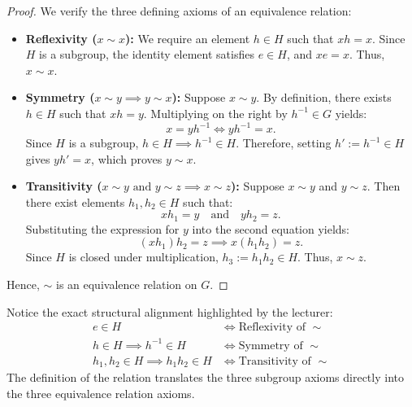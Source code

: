 \begin{content}

\begin{proof}
We verify the three defining axioms of an equivalence relation:
\begin{itemize}
    \item \textbf{Reflexivity ($x \sim x$):}
    We require an element $h \in H$ such that $xh = x$. Since $H$ is a subgroup, the identity element satisfies $e \in H$, and $xe = x$. Thus, $x \sim x$.

    \item \textbf{Symmetry ($x \sim y \implies y \sim x$):}
    Suppose $x \sim y$. By definition, there exists $h \in H$ such that $xh = y$. Multiplying on the right by $h^{-1} \in G$ yields:
    \[
    x = yh^{-1} \iff yh^{-1} = x.
    \]
    Since $H$ is a subgroup, $h \in H \implies h^{-1} \in H$. Therefore, setting $h' := h^{-1} \in H$ gives $yh' = x$, which proves $y \sim x$.

    \item \textbf{Transitivity ($x \sim y \text{ and } y \sim z \implies x \sim z$):}
    Suppose $x \sim y$ and $y \sim z$. Then there exist elements $h_1, h_2 \in H$ such that:
    \[
    xh_1 = y \quad \text{and} \quad yh_2 = z.
    \]
    Substituting the expression for $y$ into the second equation yields:
    \[
    (xh_1)h_2 = z \implies x(h_1 h_2) = z.
    \]
    Since $H$ is closed under multiplication, $h_3 := h_1 h_2 \in H$. Thus, $x \sim z$.
\end{itemize}
Hence, $\sim$ is an equivalence relation on $G$.
\end{proof}

\begin{steps}
Notice the exact structural alignment highlighted by the lecturer:
\begin{align*}
e \in H &\iff \text{Reflexivity of } \sim \\
h \in H \implies h^{-1} \in H &\iff \text{Symmetry of } \sim \\
h_1, h_2 \in H \implies h_1 h_2 \in H &\iff \text{Transitivity of } \sim
\end{align*}
The definition of the relation translates the three subgroup axioms directly into the three equivalence relation axioms.
\end{steps}
\end{content}

